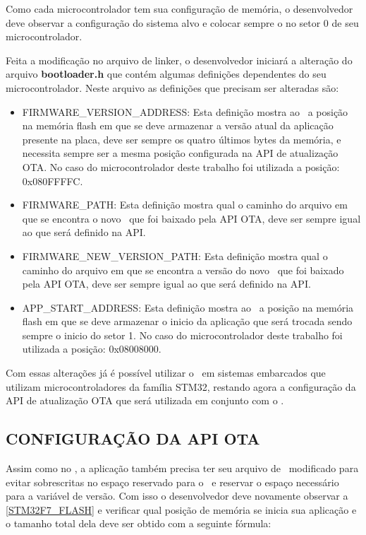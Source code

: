 Como cada microcontrolador tem sua configuração de memória, o desenvolvedor deve observar a configuração do sistema alvo e colocar sempre o \bootloader no setor 0 de seu microcontrolador.

Feita a modificação no arquivo de linker, o desenvolvedor iniciará a alteração do arquivo \textbf{bootloader.h} que contém algumas definições dependentes do seu microcontrolador. Neste arquivo as definições que precisam ser alteradas são:
\begin{itemize}
    \item FIRMWARE\_VERSION\_ADDRESS: Esta definição mostra ao \bootloader\ a posição na memória flash em que se deve armazenar a versão atual da aplicação presente na placa, deve ser sempre os quatro últimos bytes da memória, e necessita sempre ser a mesma posição configurada na API de atualização OTA. No caso do microcontrolador deste trabalho foi utilizada a posição: 0x080FFFFC.
    \item FIRMWARE\_PATH: Esta definição mostra qual o caminho do arquivo em que se encontra o novo \firmware\ que foi baixado pela API OTA, deve ser sempre igual ao que será definido na API.
    \item FIRMWARE\_NEW\_VERSION\_PATH: Esta definição mostra qual o caminho do arquivo em que se encontra a versão do novo \firmware\ que foi baixado pela API OTA, deve ser sempre igual ao que será definido na API.
    \item APP\_START\_ADDRESS: Esta definição mostra ao \bootloader\ a posição na memória flash em que se deve armazenar o inicio da aplicação que será trocada sendo sempre o inicio do setor 1. No caso do microcontrolador deste trabalho foi utilizada a posição: 0x08008000.
   
\end{itemize}

Com essas alterações já é possível utilizar o \bootloader\ em sistemas embarcados que utilizam microcontroladores da família STM32, restando agora a configuração da API de atualização OTA que será utilizada em conjunto com o \bootloader.

\subsection{CONFIGURAÇÃO DA API OTA}
Assim como no \bootloader, a aplicação também precisa ter seu arquivo de \linker\ modificado para evitar sobrescritas no espaço reservado para o \bootloader\ e reservar o espaço necessário para a variável de versão. Com isso o desenvolvedor deve novamente observar a \autoref{STM32F7_FLASH} e verificar qual posição de memória se inicia sua aplicação e o tamanho total dela deve ser obtido com a seguinte fórmula:


